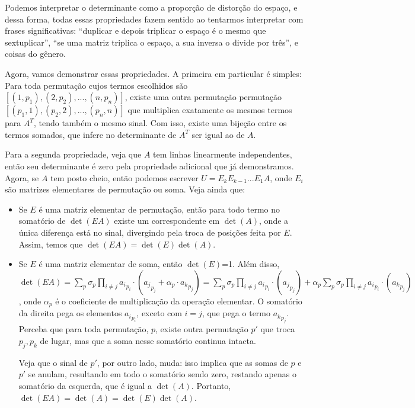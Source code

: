 \documentclass[11pt, a4paper]{article}
\begin{document}
Podemos interpretar o determinante como a proporção de distorção do espaço, e dessa forma, todas essas propriedades fazem sentido ao tentarmos interpretar com frases significativas: “duplicar e depois triplicar o espaço é o mesmo que sextuplicar”, “se uma matriz triplica o espaço, a sua inversa o divide por três”, e coisas do gênero.

Agora, vamos demonstrar essas propriedades. A primeira em particular é simples: Para toda permutação cujos termos escolhidos são \([(1,p_1),(2,p_2),...,(n,p_n)]\), existe uma outra permutação permutação \([(p_1,1),(p_2,2),...,(p_n,n)]\) que multiplica exatamente os mesmos termos para \(A^T\), tendo também o mesmo sinal. Com isso, existe uma bijeção entre os termos somados, que infere no determinante de \(A^T\) ser igual ao de \(A\).

Para a segunda propriedade, veja que \(A\) tem linhas linearmente independentes, então seu determinante é zero pela propriedade adicional que já demonstramos. Agora, se \(A\) tem posto cheio, então podemos escrever \(U=E_kE_{k-1}...E_1A\), onde \(E_i\) são matrizes elementares de permutação ou soma. Veja ainda que:

\begin{itemize}
    \item Se \(E\) é uma matriz elementar de permutação, então para todo termo no somatório de \(\det(EA)\) existe um correspondente em \(\det(A)\), onde a única diferença está no sinal, divergindo pela troca de posições feita por \(E\). Assim, temos que \(\det(EA)=\det(E)\det(A)\).

    \item Se \(E\) é uma matriz elementar de soma, então \(\det(E)\)=1. Além disso, \(\det(EA)=\sum_{p}\sigma_p\prod_{i\ne j}{a_i}_{p_i} \cdot ({a_j}_{p_j}+\alpha_p \cdot {a_k}_{p_j})=\sum_{p}\sigma_p\prod_{i\ne j}{a_i}_{p_i} \cdot ({a_j}_{p_j}) + \alpha_p \sum_{p}\sigma_p\prod_{i\ne j}{a_i}_{p_i} \cdot ({a_k}_{p_j})\), onde \(\alpha_p\) é o coeficiente de multiplicação da operação elementar. O somatório da direita pega os elementos \({a_i}_{p_i}\), exceto com \(i=j\), que pega o termo \({a_k}_{p_j}\). Perceba que para toda permutação, \(p\), existe outra permutação \(p'\) que troca \(p_j,p_k\) de lugar, mas que a soma nesse somatório continua intacta. 
    
    Veja que o sinal de \(p'\), por outro lado, muda: isso implica que as somas de \(p\) e \(p'\) se anulam, resultando em todo o somatório sendo zero, restando apenas o somatório da esquerda, que é igual a \(\det(A)\). Portanto, \(\det(EA)=\det(A)=\det(E)\det(A)\).
\end{itemize}
\end{document}
